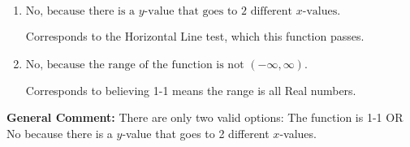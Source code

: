 \documentclass{extbook}[14pt]
\begin{document}
\begin{enumerate}
{\begin{enumerate}[label=\Alph*.]
* This is the solution.
\item \( \text{No, because there is a $y$-value that goes to 2 different $x$-values.} \)

Corresponds to the Horizontal Line test, which this function passes.
\item \( \text{No, because the range of the function is not $(-\infty, \infty)$.} \)

Corresponds to believing 1-1 means the range is all Real numbers.
\end{enumerate}

\textbf{General Comment:} There are only two valid options: The function is 1-1 OR No because there is a $y$-value that goes to 2 different $x$-values.
}
\end{enumerate}
\end{document}
